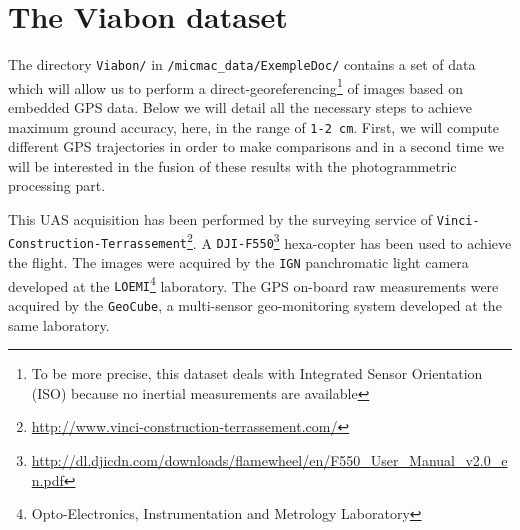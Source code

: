 \section{The Viabon dataset}


The directory {\tt Viabon/} in {\tt /micmac\_data/ExempleDoc/} contains a set of data which will allow us to perform a direct-georeferencing\footnote{To be more precise, this dataset deals with Integrated Sensor Orientation (ISO) because no inertial measurements are available} of images based on embedded GPS data. Below we will detail all the necessary steps to achieve maximum ground accuracy, here, in the range of {\tt 1-2 cm}. First, we will compute different GPS trajectories in order to make comparisons and in a second time we will be interested in the fusion of these results with the photogrammetric processing part.\newline

This UAS acquisition has been performed by the surveying service of {\tt Vinci-Construction-Terrassement}\footnote{\url{http://www.vinci-construction-terrassement.com/}}. A {\tt DJI-F550}\footnote{\url{http://dl.djicdn.com/downloads/flamewheel/en/F550_User_Manual_v2.0_en.pdf}} hexa-copter has been used to achieve the flight. The images were acquired by the {\tt IGN} panchromatic light camera developed at the {\tt LOEMI}\footnote{Opto-Electronics, Instrumentation and Metrology Laboratory} laboratory. The GPS on-board raw measurements were acquired by the {\tt GeoCube}, a multi-sensor geo-monitoring system developed at the same laboratory.\newline

